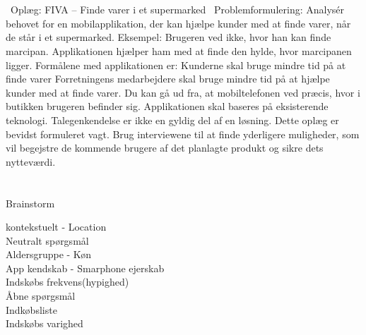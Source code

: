 \documentclass[12pt]{article}
\begin{document}
\section*{}
 \ Oplæg: FIVA – Finde varer i et supermarked
 \ Problemformulering: Analysér behovet for en mobilapplikation, der kan hjælpe kunder med at finde varer, når de står i et
supermarked. Eksempel: Brugeren ved ikke, hvor han kan finde marcipan. Applikationen hjælper
ham med at finde den hylde, hvor marcipanen ligger.
Formålene med applikationen er:
  Kunderne skal bruge mindre tid på at finde varer
  Forretningens medarbejdere skal bruge mindre tid på at hjælpe kunder med at finde varer.
Du kan gå ud fra, at mobiltelefonen ved præcis, hvor i butikken brugeren befinder sig.
Applikationen skal baseres på eksisterende teknologi. Talegenkendelse er ikke en gyldig del af en
løsning.
Dette oplæg er bevidst formuleret vagt. Brug interviewene til at finde yderligere muligheder, som
vil begejstre de kommende brugere af det planlagte produkt og sikre dets nytteværdi.

\section*{}
 Brainstorm

  kontekstuelt - Location \\

  Neutralt sp\o rgsm\aa l \\

  Aldersgruppe - K\o n \\

  App kendskab - Smarphone ejerskab \\ 

  Indsk\o bs frekvens(hypighed) \\

  \AA bne sp\o rgsm\aa l \\ 

  Indk\o bsliste \\
  
  Indsk\o bs varighed  
\end{document}
